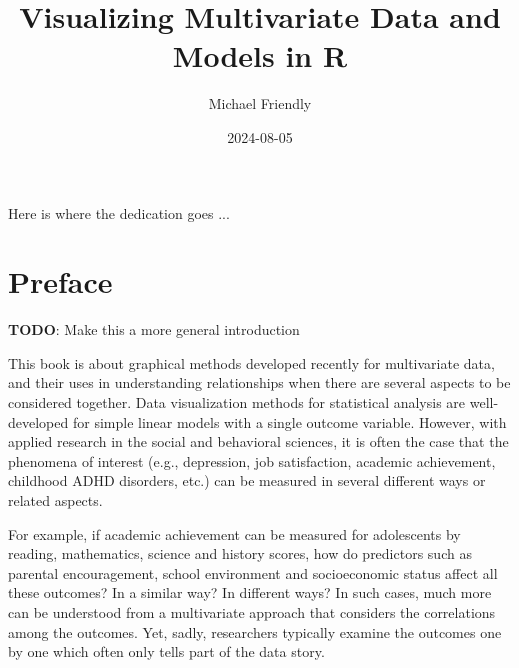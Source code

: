 \documentclass[
  letterpaper,
  10pt,
  krantz2]{krantz}
\title{Visualizing Multivariate Data and Models in R}
\author{Michael Friendly}
\date{2024-08-05}
\renewcommand*\contentsname{Table of contents}
\newcommand\contentsname{Table of contents}
\begin{document}
\maketitle


\thispagestyle{empty}

\begin{center}
Here is where the dedication goes ...
\end{center}

\setlength{\abovedisplayskip}{-5pt}
\setlength{\abovedisplayshortskip}{-5pt}

\renewcommand*\contentsname{Table of contents}
{
\hypersetup{linkcolor=}
\setcounter{tocdepth}{2}
\tableofcontents
}


\chapter*{Preface}\label{preface}


\textbf{TODO}: Make this a more general introduction

This book is about graphical methods developed recently for multivariate
data, and their uses in understanding relationships when there are
several aspects to be considered together. Data visualization methods
for statistical analysis are well-developed for simple linear models
with a single outcome variable. However, with applied research in the
social and behavioral sciences, it is often the case that the phenomena
of interest (e.g., depression, job satisfaction, academic achievement,
childhood ADHD disorders, etc.) can be measured in several different
ways or related aspects.

For example, if academic achievement can be measured for adolescents by
reading, mathematics, science and history scores, how do predictors such
as parental encouragement, school environment and socioeconomic status
affect all these outcomes? In a similar way? In different ways? In such
cases, much more can be understood from a multivariate approach that
considers the correlations among the outcomes. Yet, sadly, researchers
typically examine the outcomes one by one which often only tells part of
the data story.
\end{document}
